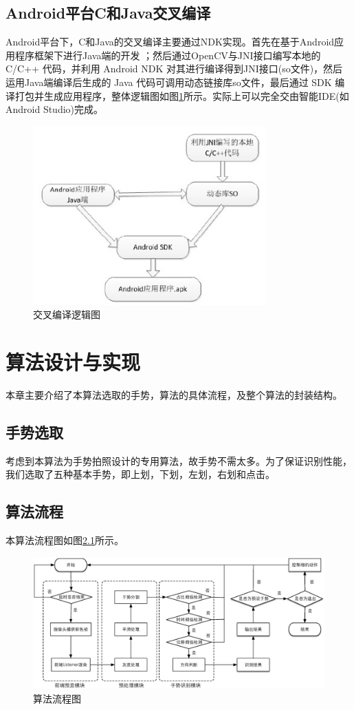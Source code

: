 \documentclass{XDBAthesis}
\begin{document}
\section{Android平台C和Java交叉编译}
Android平台下，C和Java的交叉编译主要通过NDK实现。首先在基于Android应用程序框架下进行Java端的开发\cite{祝志远2015基于} ；然后通过OpenCV与JNI接口编写本地的 C/C++ 代码，并利用 Android NDK 对其进行编译得到JNI接口(so文件)，然后运用Java端编译后生成的 Java 代码可调用动态链接库so文件，最后通过 SDK 编译打包并生成应用程序，整体逻辑图如图\ref{fg:whole}所示。实际上可以完全交由智能IDE(如Android Studio)完成。
\begin{figure}[htb]
    \centering
    \includegraphics[width=0.8\textwidth]{figure/opencv}
    \caption{交叉编译逻辑图}
    \label{fg:whole}
\end{figure}



\chapter{算法设计与实现}
本章主要介绍了本算法选取的手势，算法的具体流程，及整个算法的封装结构。
\section{手势选取}
考虑到本算法为手势拍照设计的专用算法，故手势不需太多。为了保证识别性能，我们选取了五种基本手势，即上划，下划，左划，右划和点击。
\section{算法流程}
本算法流程图如图\ref{fg:af}所示。
\begin{figure}[htb]
    \centering
    \includegraphics[width=\textwidth ]{figure/algorithmflow}
    \caption{算法流程图}
    \label{fg:af}
\end{figure}
\end{document}
